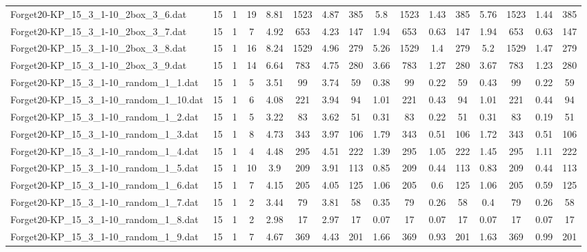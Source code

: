 \begin{sidewaystable}[!ht]
{\begin{tabular}{lccccccccccccccc}
Forget20-KP\_15\_3\_1-10\_2box\_3\_6.dat & 15 & 1 & 19 & 8.81 & 1523 & 4.87 & 385 & 5.8 & 1523 & 1.43 & 385 & 5.76 & 1523 & 1.44 & 385 \\
Forget20-KP\_15\_3\_1-10\_2box\_3\_7.dat & 15 & 1 & 7 & 4.92 & 653 & 4.23 & 147 & 1.94 & 653 & 0.63 & 147 & 1.94 & 653 & 0.63 & 147 \\
Forget20-KP\_15\_3\_1-10\_2box\_3\_8.dat & 15 & 1 & 16 & 8.24 & 1529 & 4.96 & 279 & 5.26 & 1529 & 1.4 & 279 & 5.2 & 1529 & 1.47 & 279 \\
Forget20-KP\_15\_3\_1-10\_2box\_3\_9.dat & 15 & 1 & 14 & 6.64 & 783 & 4.75 & 280 & 3.66 & 783 & 1.27 & 280 & 3.67 & 783 &  \textcolor{blue2}{1.23} & 280 \\
Forget20-KP\_15\_3\_1-10\_random\_1\_1.dat & 15 & 1 & 5 & 3.51 & 99 & 3.74 & 59 & 0.38 & 99 &  \textcolor{blue2}{0.22} & 59 & 0.43 & 99 &  \textcolor{blue2}{0.22} & 59 \\
Forget20-KP\_15\_3\_1-10\_random\_1\_10.dat & 15 & 1 & 6 & 4.08 & 221 & 3.94 & 94 & 1.01 & 221 &  \textcolor{blue2}{0.43} & 94 & 1.01 & 221 & 0.44 & 94 \\
Forget20-KP\_15\_3\_1-10\_random\_1\_2.dat & 15 & 1 & 5 & 3.22 & 83 & 3.62 & 51 & 0.31 & 83 & 0.22 & 51 & 0.31 & 83 &  \textcolor{blue2}{0.19} & 51 \\
Forget20-KP\_15\_3\_1-10\_random\_1\_3.dat & 15 & 1 & 8 & 4.73 & 343 & 3.97 & 106 & 1.79 & 343 &  \textcolor{blue2}{0.51} & 106 & 1.72 & 343 &  \textcolor{blue2}{0.51} & 106 \\
Forget20-KP\_15\_3\_1-10\_random\_1\_4.dat & 15 & 1 & 4 & 4.48 & 295 & 4.51 & 222 & 1.39 & 295 &  \textcolor{blue2}{1.05} & 222 & 1.45 & 295 & 1.11 & 222 \\
Forget20-KP\_15\_3\_1-10\_random\_1\_5.dat & 15 & 1 & 10 & 3.9 & 209 & 3.91 & 113 & 0.85 & 209 &  \textcolor{blue2}{0.44} & 113 & 0.83 & 209 &  \textcolor{blue2}{0.44} & 113 \\
Forget20-KP\_15\_3\_1-10\_random\_1\_6.dat & 15 & 1 & 7 & 4.15 & 205 & 4.05 & 125 & 1.06 & 205 & 0.6 & 125 & 1.06 & 205 &  \textcolor{blue2}{0.59} & 125 \\
Forget20-KP\_15\_3\_1-10\_random\_1\_7.dat & 15 & 1 & 2 & 3.44 & 79 & 3.81 & 58 & 0.35 & 79 & 0.26 & 58 & 0.4 & 79 & 0.26 & 58 \\
Forget20-KP\_15\_3\_1-10\_random\_1\_8.dat & 15 & 1 & 2 & 2.98 & 17 & 2.97 & 17 &  \textcolor{blue2}{0.07} & 17 &  \textcolor{blue2}{0.07} & 17 &  \textcolor{blue2}{0.07} & 17 &  \textcolor{blue2}{0.07} & 17 \\
Forget20-KP\_15\_3\_1-10\_random\_1\_9.dat & 15 & 1 & 7 & 4.67 & 369 & 4.43 & 201 & 1.66 & 369 &  \textcolor{blue2}{0.93} & 201 & 1.63 & 369 & 0.99 & 201 \\

\end{tabular}}
\end{sidewaystable}
